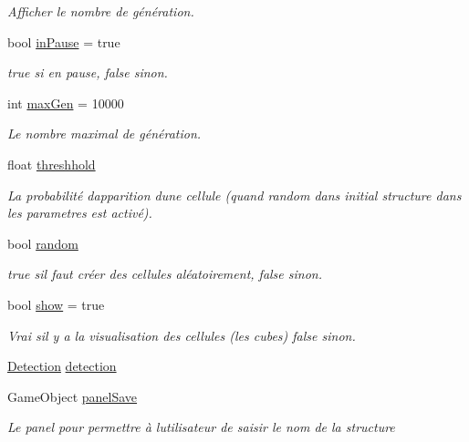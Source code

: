 \begin{DoxyCompactItemize}
\begin{DoxyCompactList}\small\item\em Afficher le nombre de génération. \end{DoxyCompactList}\item 
bool \mbox{\hyperlink{class_simulation2_ae39c9077019822d56529bafcba2727c1}{in\+Pause}} = true
\begin{DoxyCompactList}\small\item\em true si en pause, false sinon. \end{DoxyCompactList}\item 
int \mbox{\hyperlink{class_simulation2_a37f3b0f46bf617f526d81ca01fac23e2}{max\+Gen}} = 10000
\begin{DoxyCompactList}\small\item\em Le nombre maximal de génération. \end{DoxyCompactList}\item 
float \mbox{\hyperlink{class_simulation2_a17803d7383b2bbd62c96572cd3370d06}{threshhold}}
\begin{DoxyCompactList}\small\item\em La probabilité d\textquotesingle{}apparition d\textquotesingle{}une cellule (quand random dans initial structure dans les parametres est activé). \end{DoxyCompactList}\item 
bool \mbox{\hyperlink{class_simulation2_a48db27680b5deaf8e913924a75b6916c}{random}}
\begin{DoxyCompactList}\small\item\em true s\textquotesingle{}il faut créer des cellules aléatoirement, false sinon. \end{DoxyCompactList}\item 
bool \mbox{\hyperlink{class_simulation2_afcd6fde8b8c81ef7d832b60cd1b0c6a6}{show}} = true
\begin{DoxyCompactList}\small\item\em Vrai s\textquotesingle{}il y a la visualisation des cellules (les cubes) false sinon. \end{DoxyCompactList}\item 
\mbox{\hyperlink{class_detection}{Detection}} \mbox{\hyperlink{class_simulation2_a0d4f89afd07a433b02633bf25c82f2a6}{detection}}
\item 
Game\+Object \mbox{\hyperlink{class_simulation2_adfadcc7cb6f6be95e7280e4bdafb8eaa}{panel\+Save}}
\begin{DoxyCompactList}\small\item\em Le panel pour permettre à l\textquotesingle{}utilisateur de saisir le nom de la structure \end{DoxyCompactList}\item 

\end{DoxyCompactItemize}
